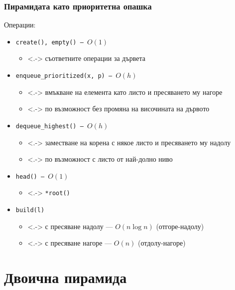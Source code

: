 \documentclass{beamer}
\begin{document}
\begin{frame}
  \frametitle{Пирамидата като приоритетна опашка}

  Операции:
  \begin{itemize}[<+->]
  \item \tt{create()}, \tt{empty()} --- $O(1)$
    \begin{itemize}
    \item<.-> съответните операции за дървета
    \end{itemize}
  \item \tt{enqueue\_prioritized(x, p)} --- $O(h)$
    \begin{itemize}
    \item<.-> вмъкване на елемента като листо и пресяването му нагоре
    \item<.-> по възможност без промяна на височината на дървото
    \end{itemize}
  \item \tt{dequeue\_highest()} --- $O(h)$
    \begin{itemize}
    \item<.-> заместване на корена с някое листо и пресяването му надолу
    \item<.-> по възможност с листо от най-долно ниво
    \end{itemize}
  \item \tt{head()} --- $O(1)$
    \begin{itemize}
    \item<.-> \tt{*root()}
    \end{itemize}
  \item \tt{build(l)}
    \begin{itemize}
    \item<.-> с пресяване надолу --- $O(n\log n)$ (отгоре-надолу)
    \item<.-> с пресяване нагоре  --- $O(n)$ (отдолу-нагоре)
    \end{itemize}
  \end{itemize}
\end{frame}

\section{Двоична пирамида}
\end{document}
